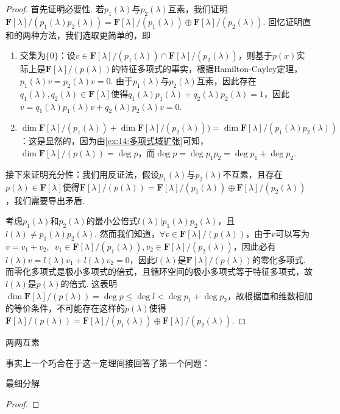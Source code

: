 \begin{proof}
    首先证明必要性. 若$p_1(\lambda)$与$p_2(\lambda)$互素，我们证明$\mathbf{F}[\lambda]/(p_1(\lambda)p_2(\lambda))=\mathbf{F}[\lambda]/(p_1(\lambda))\oplus\mathbf{F}[\lambda]/(p_2(\lambda))$. 回忆证明直和的两种方法，我们选取更简单的，即
    \begin{enumerate}
        \item 交集为$\{0\}$：设$v\in\mathbf{F}[\lambda]/(p_1(\lambda))\cap\mathbf{F}[\lambda]/(p_2(\lambda))$，则基于$p(x)$实际上是$\mathbf{F}[\lambda]/(p(\lambda))$的特征多项式的事实，根据Hamilton-Cayley定理，$p_1(\lambda)v=p_2(\lambda)v=0$. 由于$p_1(\lambda)$与$p_2(\lambda)$互素，因此存在$q_1(\lambda),q_2(\lambda)\in\mathbf{F}[\lambda]$使得$q_1(\lambda)p_1(\lambda)+q_2(\lambda)p_2(\lambda)=1$，因此$v=q_1(\lambda)p_1(\lambda)v+q_2(\lambda)p_2(\lambda)v=0$.
        \item $\dim\mathbf{F}[\lambda]/(p_1(\lambda))+\dim\mathbf{F}[\lambda]/(p_2(\lambda)))=\dim\mathbf{F}[\lambda]/(p_1(\lambda)p_2(\lambda))$：这是显然的，因为由\autoref{ex:14:多项式域扩张}可知，$\dim\mathbf{F}[\lambda]/(p(\lambda))=\deg p$，而$\deg p=\deg p_1p_2=\deg p_1+\deg p_2$.
    \end{enumerate}
    接下来证明充分性：我们用反证法，假设$p_1(\lambda)$与$p_2(\lambda)$不互素，且存在$p(\lambda)\in\mathbf{F}[\lambda]$使得$\mathbf{F}[\lambda]/(p(\lambda))=\mathbf{F}[\lambda]/(p_1(\lambda))\oplus\mathbf{F}[\lambda]/(p_2(\lambda))$，我们需要导出矛盾.

    考虑$p_1(\lambda)$和$p_2(\lambda)$的最小公倍式$l(\lambda)|p_1(\lambda)p_2(\lambda)$，且$l(\lambda)\neq p_1(\lambda)p_2(\lambda)$. 然而我们知道，$\forall v\in\mathbf{F}[\lambda]/(p(\lambda))$，由于$v$可以写为$v=v_1+v_2,\enspace v_1\in\mathbf{F}[\lambda]/(p_1(\lambda)),v_2\in\mathbf{F}[\lambda]/(p_2(\lambda))$，因此必有$l(\lambda)v=l(\lambda)v_1+l(\lambda)v_2=0$，因此$l(\lambda)$是$\mathbf{F}[\lambda]/(p(\lambda))$的零化多项式. 而零化多项式是极小多项式的倍式，且循环空间的极小多项式等于特征多项式，故$l(\lambda)$是$p(\lambda)$的倍式. 这表明$\dim\mathbf{F}[\lambda]/(p(\lambda))=\deg p\leqslant \deg l<\deg p_1+\deg p_2$，故根据直和维数相加的等价条件，不可能存在这样的$p(\lambda)$使得$\mathbf{F}[\lambda]/(p(\lambda))=\mathbf{F}[\lambda]/(p_1(\lambda))\oplus\mathbf{F}[\lambda]/(p_2(\lambda))$.
\end{proof}

\begin{corollary}
    两两互素
\end{corollary}

事实上一个巧合在于这一定理间接回答了第一个问题：
\begin{corollary}
    最细分解
\end{corollary}
\begin{proof}

\end{proof}


